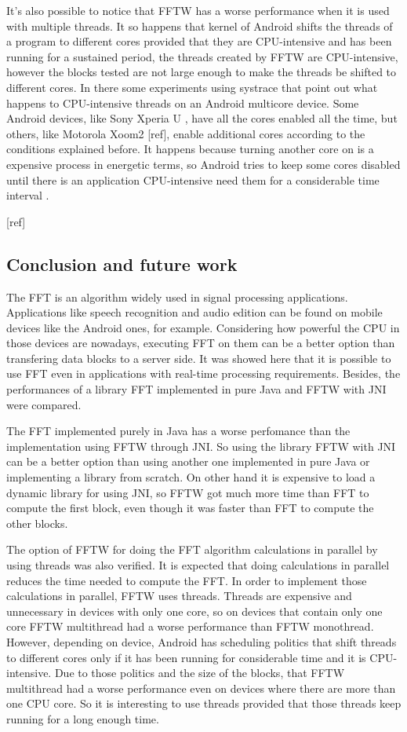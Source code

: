 \documentclass[12pt]{article}
\begin{document}
It's also possible to notice that FFTW has a worse performance when it is used
with multiple threads. It so happens that kernel of Android shifts the threads
of a program to different cores provided that they are CPU-intensive and has
been running for a sustained period, the threads created by FFTW are
CPU-intensive, however the blocks tested are not large enough to make the
threads be shifted to different cores. In \cite{systrace}
there some experiments using systrace
\cite{systraceandroid} that point out
what happens to CPU-intensive threads on an Android multicore device. Some
Android devices, like Sony Xperia U \cite{xperiauspecs}, have all the cores enabled all the time,
but others, like Motorola Xoom2 [ref], enable additional cores according to the conditions
explained before. It happens because turning another core on
is a expensive process in energetic terms, so Android tries to keep  some cores
disabled until there is an application CPU-intensive need them for a considerable
time interval \cite{systrace}.


[ref] 


\subsection{ Conclusion and future work}

The FFT is an algorithm widely used in signal processing applications. Applications like speech recognition and audio edition can be found on mobile devices like the Android ones, for example. Considering how powerful the CPU in those devices are nowadays, executing FFT on them can be a better option than transfering data blocks to a server side. It was showed here that it is possible to use FFT even in applications with real-time processing requirements. Besides, the performances of a library FFT implemented in pure Java and FFTW with JNI were compared.

The FFT implemented purely in Java has a worse perfomance than the implementation using FFTW through JNI. So using the library FFTW with JNI can be a better option than using another one implemented in pure Java or implementing a library from scratch. On other hand it is expensive to load a dynamic library for using JNI, so FFTW got much more time than FFT to compute the first block, even though it was faster than FFT to compute the other blocks.

The option of FFTW for doing the FFT algorithm calculations in parallel by using threads was also verified. It is expected that doing calculations in parallel reduces the time needed to compute the FFT. In order to implement those calculations in parallel, FFTW uses threads. Threads are expensive and unnecessary in devices with only one core, so on devices that contain only one core FFTW multithread had a worse performance than FFTW monothread. However, depending on device, Android has scheduling politics that shift threads to different cores only if it has been running for considerable time and it is CPU-intensive. Due to those politics and the size of the blocks, that FFTW multithread had a worse performance even on devices where there are more than one CPU core. So it is interesting to use threads provided that those threads keep running for a long enough time. 
\end{document}
